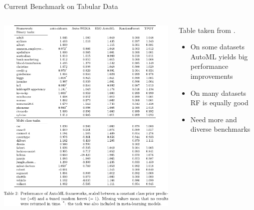 \begin{frame}{Current Benchmark on Tabular Data}
  \begin{columns}
    \begin{column}{0.43\textwidth}
      \vspace{-0.7cm}

   
      \begin{center}
        \includegraphics[width = \textwidth]{images/gijsbers_open_2019_tab2.pdf}
      \end{center}
    \end{column}%
    \begin{column}{0.57\textwidth}
      Table taken from .

      \begin{itemize}
        \item On some datasets AutoML yields big performance improvements
        \item On many datasets RF is equally good
        \item Need more and diverse benchmarks
      \end{itemize}

    \end{column}
  \end{columns}
\end{frame}

